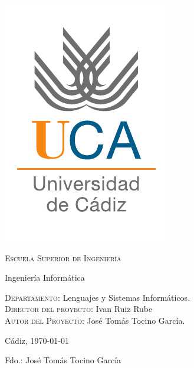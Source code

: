 {
  \thispagestyle{empty}
  \centering
  \includegraphics[width=.2\textwidth]{0_misc/logo_uca}

  \bigskip
  \bigskip
  \bigskip
  
  \begin{changemargin}{3em}{3em}

    \begin{center}
      {\Huge \textsc{\nohyphens{Escuela Superior de Ingeniería}}}
      
      \bigskip
      \bigskip
      
      {\huge \nohyphens{Ingeniería Informática}}
      
      \bigskip
      \bigskip
      \bigskip
      \bigskip
      
      \begin{doublespace}
        {\LARGE \nohyphens{\nombreProyecto}}
      \end{doublespace}


      \bigskip
      \bigskip
      \bigskip
      \bigskip
      
    \end{center}
  \end{changemargin}
  \begin{changemargin}{3em}{1em}
  \begin{flushleft}
    \Large

    \textsc{Departamento}: \nohyphens{Lenguajes y Sistemas Informáticos.} \\
    \textsc{Director del proyecto}: \nohyphens{Ivan Ruiz Rube} \\
    \textsc{Autor del Proyecto}: \nohyphens{José Tomás Tocino García}. \\
  \end{flushleft}

  \end{changemargin}  

  \bigskip
  \bigskip
  \bigskip
  
  \begin{flushright}
    \large
    Cádiz, \today

    \bigskip
    \bigskip
    \bigskip
    \bigskip    
    \bigskip
    \bigskip

    Fdo.: José Tomás Tocino García
    
  \end{flushright}

}

